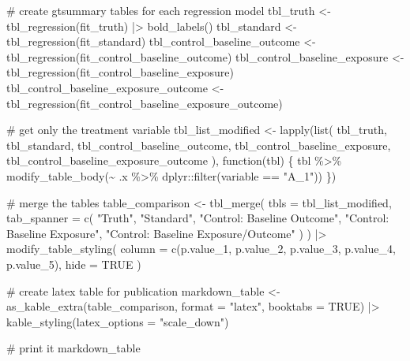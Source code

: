 \documentclass[
  singlecolumn]{article}
\newenvironment{Shaded}{\begin{snugshade}}{\end{snugshade}}
\newcommand{\AttributeTok}[1]{\textcolor[rgb]{0.40,0.45,0.13}{#1}}
\newcommand{\CommentTok}[1]{\textcolor[rgb]{0.37,0.37,0.37}{#1}}
\newcommand{\ConstantTok}[1]{\textcolor[rgb]{0.56,0.35,0.01}{#1}}
\newcommand{\ControlFlowTok}[1]{\textcolor[rgb]{0.00,0.23,0.31}{#1}}
\newcommand{\FunctionTok}[1]{\textcolor[rgb]{0.28,0.35,0.67}{#1}}
\newcommand{\NormalTok}[1]{\textcolor[rgb]{0.00,0.23,0.31}{#1}}
\newcommand{\OtherTok}[1]{\textcolor[rgb]{0.00,0.23,0.31}{#1}}
\newcommand{\SpecialCharTok}[1]{\textcolor[rgb]{0.37,0.37,0.37}{#1}}
\newcommand{\StringTok}[1]{\textcolor[rgb]{0.13,0.47,0.30}{#1}}
\begin{document}
\begin{Shaded}
\begin{Highlighting}[]
\CommentTok{\# create gtsummary tables for each regression model}
\NormalTok{tbl\_truth }\OtherTok{\textless{}{-}} \FunctionTok{tbl\_regression}\NormalTok{(fit\_truth)  }\SpecialCharTok{|\textgreater{}} \FunctionTok{bold\_labels}\NormalTok{()}
\NormalTok{tbl\_standard }\OtherTok{\textless{}{-}} \FunctionTok{tbl\_regression}\NormalTok{(fit\_standard)}
\NormalTok{tbl\_control\_baseline\_outcome }\OtherTok{\textless{}{-}}
  \FunctionTok{tbl\_regression}\NormalTok{(fit\_control\_baseline\_outcome)}
\NormalTok{tbl\_control\_baseline\_exposure }\OtherTok{\textless{}{-}}
  \FunctionTok{tbl\_regression}\NormalTok{(fit\_control\_baseline\_exposure)}
\NormalTok{tbl\_control\_baseline\_exposure\_outcome }\OtherTok{\textless{}{-}}
  \FunctionTok{tbl\_regression}\NormalTok{(fit\_control\_baseline\_exposure\_outcome)}

\CommentTok{\# get only the treatment variable}
\NormalTok{tbl\_list\_modified }\OtherTok{\textless{}{-}} \FunctionTok{lapply}\NormalTok{(}\FunctionTok{list}\NormalTok{(}
\NormalTok{  tbl\_truth,}
\NormalTok{  tbl\_standard,}
\NormalTok{  tbl\_control\_baseline\_outcome,}
\NormalTok{  tbl\_control\_baseline\_exposure,}
\NormalTok{  tbl\_control\_baseline\_exposure\_outcome}
\NormalTok{),}
\ControlFlowTok{function}\NormalTok{(tbl) \{}
\NormalTok{  tbl }\SpecialCharTok{\%\textgreater{}\%}
    \FunctionTok{modify\_table\_body}\NormalTok{(}\SpecialCharTok{\textasciitilde{}}\NormalTok{ .x }\SpecialCharTok{\%\textgreater{}\%}\NormalTok{ dplyr}\SpecialCharTok{::}\FunctionTok{filter}\NormalTok{(variable }\SpecialCharTok{==} \StringTok{"A\_1"}\NormalTok{))}
\NormalTok{\})}


\CommentTok{\# merge the tables}
\NormalTok{table\_comparison }\OtherTok{\textless{}{-}} \FunctionTok{tbl\_merge}\NormalTok{(}
  \AttributeTok{tbls =}\NormalTok{ tbl\_list\_modified,}
  \AttributeTok{tab\_spanner =} \FunctionTok{c}\NormalTok{(}
    \StringTok{"Truth"}\NormalTok{,}
    \StringTok{"Standard"}\NormalTok{,}
    \StringTok{"Control: Baseline Outcome"}\NormalTok{,}
    \StringTok{"Control: Baseline Exposure"}\NormalTok{,}
    \StringTok{"Control: Baseline Exposure/Outcome"}
\NormalTok{  )}
\NormalTok{) }\SpecialCharTok{|\textgreater{}}
  \FunctionTok{modify\_table\_styling}\NormalTok{(}
    \AttributeTok{column =} \FunctionTok{c}\NormalTok{(p.value\_1, p.value\_2, p.value\_3, p.value\_4, p.value\_5),}
    \AttributeTok{hide =} \ConstantTok{TRUE}
\NormalTok{  )}

\CommentTok{\# create latex table for publication}
\NormalTok{markdown\_table }\OtherTok{\textless{}{-}}
  \FunctionTok{as\_kable\_extra}\NormalTok{(table\_comparison, }\AttributeTok{format =} \StringTok{"latex"}\NormalTok{, }\AttributeTok{booktabs =} \ConstantTok{TRUE}\NormalTok{) }\SpecialCharTok{|\textgreater{}}
  \FunctionTok{kable\_styling}\NormalTok{(}\AttributeTok{latex\_options =} \StringTok{"scale\_down"}\NormalTok{)}

\CommentTok{\# print it}
\NormalTok{markdown\_table}
\end{Highlighting}
\end{Shaded}
\end{document}
